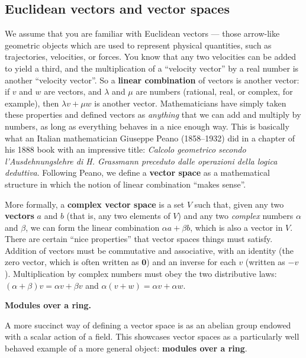 \documentclass[fleqn,a4paper]{article}
\newenvironment{technical}[1]{\textbf{#1.}\par\vspace{.5\baselineskip}\everypar{\setlength{\parindent}{1.5em}}}{}
\theoremstyle{definition}
\theoremstyle{definition}
\theoremstyle{definition}
\theoremstyle{definition}
\theoremstyle{remark}
\begin{document}
\hypertarget{euclidean-vectors-and-vector-spaces}{%
\subsection{Euclidean vectors and vector spaces}\label{euclidean-vectors-and-vector-spaces}}

We assume that you are familiar with Euclidean vectors --- those arrow-like geometric objects which are used to represent physical quantities, such as trajectories, velocities, or forces.
You know that any two velocities can be added to yield a third, and the multiplication of a ``velocity vector'' by a real number is another ``velocity vector''.
So a \textbf{linear combination} of vectors is another vector: if \(v\) and \(w\) are vectors, and \(\lambda\) and \(\mu\) are numbers (rational, real, or complex, for example), then \(\lambda v+\mu w\) is another vector.
Mathematicians have simply taken these properties and defined vectors as \emph{anything} that we can add and multiply by numbers, as long as everything behaves in a nice enough way.
This is basically what an Italian mathematician Giuseppe Peano (1858--1932) did in a chapter of his 1888 book with an impressive title: \emph{Calcolo geometrico secondo l'Ausdehnungslehre di H. Grassmann preceduto dalle operazioni della logica deduttiva}.
Following Peano, we define a \textbf{vector space} as a mathematical structure in which the notion of linear combination ``makes sense''.

More formally, a \textbf{complex vector space} is a set \(V\) such that, given any two \textbf{vectors} \(a\) and \(b\) (that is, any two elements of \(V\)) and any two \emph{complex} numbers \(\alpha\) and \(\beta\), we can form the linear combination \(\alpha a+\beta b\), which is also a vector in \(V\).
There are certain ``nice properties'' that vector spaces things must satisfy. Addition of vectors must be commutative and associative, with an identity (the zero vector, which is often written as \(\mathbf{0}\)) and an inverse for each \(v\) (written as \(-v\)). Multiplication by complex numbers must obey the two distributive laws: \((\alpha+\beta)v = \alpha v+\beta v\) and \(\alpha (v+w) = \alpha v+\alpha w\).

\begin{technical}{Modules over a ring}
A more succinct way of defining a vector space is as an abelian group endowed with a scalar action of a field.
This showcases vector spaces as a particularly well behaved example of a more general object: \textbf{modules over a ring}.

\end{technical}
\end{document}
